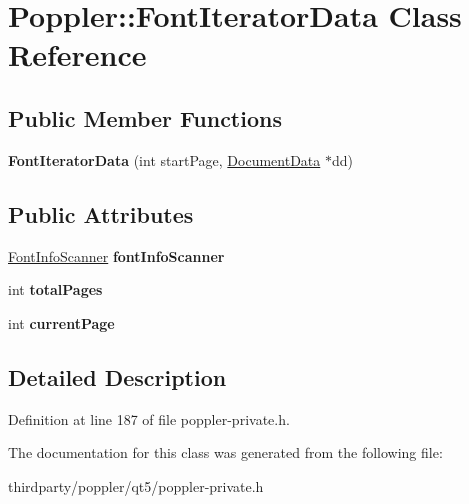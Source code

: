 \hypertarget{class_poppler_1_1_font_iterator_data}{}\section{Poppler\+:\+:Font\+Iterator\+Data Class Reference}
\label{class_poppler_1_1_font_iterator_data}
\subsection*{Public Member Functions}
\begin{DoxyCompactItemize}
\item 
\mbox{\label{class_poppler_1_1_font_iterator_data_aac074e0502d182fad5dfb4a69c515bc9}} 
{\bfseries Font\+Iterator\+Data} (int start\+Page, \hyperlink{class_poppler_1_1_document_data}{Document\+Data} $\ast$dd)
\end{DoxyCompactItemize}
\subsection*{Public Attributes}
\begin{DoxyCompactItemize}
\item 
\mbox{\label{class_poppler_1_1_font_iterator_data_a6cf4b10852308bc63f7ad4176b560373}} 
\hyperlink{class_font_info_scanner}{Font\+Info\+Scanner} {\bfseries font\+Info\+Scanner}
\item 
\mbox{\label{class_poppler_1_1_font_iterator_data_aa0222107cca88120572b7bfe6dae3216}} 
int {\bfseries total\+Pages}
\item 
\mbox{\label{class_poppler_1_1_font_iterator_data_a098d3220f7315af2bdc9de85c361edf9}} 
int {\bfseries current\+Page}
\end{DoxyCompactItemize}


\subsection{Detailed Description}


Definition at line 187 of file poppler-\/private.\+h.



The documentation for this class was generated from the following file\+:\begin{DoxyCompactItemize}
\item 
thirdparty/poppler/qt5/poppler-\/private.\+h\end{DoxyCompactItemize}
